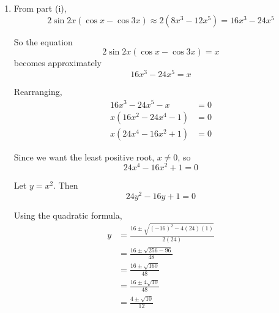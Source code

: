 \documentclass[leqno]{article}
\begin{document}
\begin{enumerate}[
  label=\textbf{\arabic*.},
  leftmargin=*,
  topsep=0pt,
  partopsep=0pt,
  parsep=0pt
]
\begin{tcolorbox}[colback=white, colframe=scarlet, title={\textbf{Solution}}, breakable, grow to left by=6mm, grow to right by=10mm]
\begin{enumerate}[label=\textbf{(\roman*)}]
Now expand \(\cos x-\cos 3x\):
\begin{align*}
\cos x&=1-\frac{x^2}{2}+\frac{x^4}{24}+\cdots\\
\cos 3x&=1-\frac{(3x)^2}{2}+\frac{(3x)^4}{24}+\cdots\\
&=1-\frac{9x^2}{2}+\frac{81x^4}{24}+\cdots
\end{align*}

So
\begin{align*}
\cos x-\cos 3x
&=\left(1-\frac{x^2}{2}+\frac{x^4}{24}\right)-\left(1-\frac{9x^2}{2}+\frac{81x^4}{24}\right)+\cdots\\
&=4x^2-\frac{80x^4}{24}+\cdots\\
&=4x^2-\frac{10}{3}x^4+\cdots
\end{align*}

Now multiply:
\begin{align*}
\sin 2x(\cos x-\cos 3x)
&=\left(2x-\frac{4}{3}x^3+\frac{4}{15}x^5+\cdots\right)\left(4x^2-\frac{10}{3}x^4+\cdots\right)
\end{align*}

Keeping terms up to \(x^5\),
\begin{align*}
\sin 2x(\cos x-\cos 3x)
&=(2x)(4x^2)+(2x)\left(-\frac{10}{3}x^4\right)+\left(-\frac{4}{3}x^3\right)(4x^2)+\cdots\\
&=8x^3-\frac{20}{3}x^5-\frac{16}{3}x^5+\cdots\\
&=8x^3-12x^5+\cdots
\end{align*}

Hence,
\[
\sin 2x(\cos x-\cos 3x)=8x^3-12x^5+\cdots
\]

\item From part (i),
\[
2\sin 2x(\cos x-\cos 3x)\approx 2(8x^3-12x^5)=16x^3-24x^5
\]

So the equation
\[
2\sin 2x(\cos x-\cos 3x)=x
\]
becomes approximately
\[
16x^3-24x^5=x
\]

Rearranging,
\begin{align*}
16x^3-24x^5-x&=0\\
x(16x^2-24x^4-1)&=0\\
x(24x^4-16x^2+1)&=0
\end{align*}

Since we want the least positive root, \(x\neq 0\), so
\[
24x^4-16x^2+1=0
\]

Let \(y=x^2\). Then
\[
24y^2-16y+1=0
\]

Using the quadratic formula,
\begin{align*}
y&=\frac{16\pm\sqrt{(-16)^2-4(24)(1)}}{2(24)}\\
&=\frac{16\pm\sqrt{256-96}}{48}\\
&=\frac{16\pm\sqrt{160}}{48}\\
&=\frac{16\pm 4\sqrt{10}}{48}\\
&=\frac{4\pm\sqrt{10}}{12}
\end{align*}


\end{enumerate}
\end{tcolorbox}
\end{enumerate}
\end{document}
